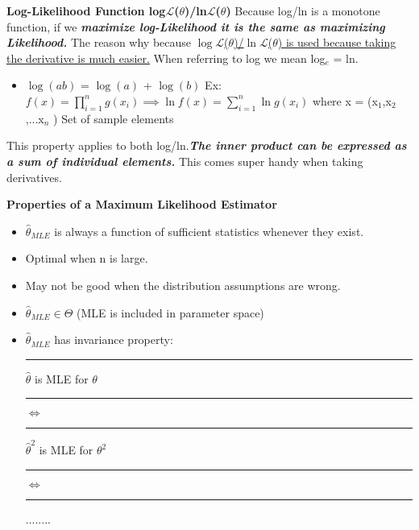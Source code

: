 \documentclass[]{article}
\begin{document}
\Large\textbf{Log-Likelihood Function log$\mathcal{L}$($\theta$)/ln$\mathcal{L}$($\theta$)}
\newline Because log/ln is a monotone function, if we \textbf{\textit{maximize log-Likelihood it is the same as maximizing Likelihood.} } The reason why  because \ul{$\log\mathcal{L}$($\theta$)/$\ln\mathcal{L}$($\theta$) is used because taking the derivative is much easier.} When referring to log we mean log$_e$ = ln.
\begin{itemize}
	\item $\log(ab)$ = $\log(a)$ + $\log(b)$
	\newline Ex: $f(x) = \displaystyle\prod_{i=1}^{n}g(x_i) \implies \ln{f(x)} =  \sum_{i=1}^{n} \ln g(x_i)$ 
	\newline where x = (x$_1$,x$_2$,...x$_n$ )  Set of sample elements
\end{itemize}
This property applies to both log/ln.\textbf{\textit{The inner product can be expressed as a sum of individual elements.}} This comes super handy when taking derivatives.

\newpage
\Large\textbf{Properties of a Maximum Likelihood Estimator}
\begin{itemize}
	\item $\hat\theta_{MLE}$ is always a function of sufficient statistics whenever they exist.
	\item Optimal when n is large.
	\item May not be good when the distribution assumptions are wrong.
	\item $\hat\theta_{MLE} \in \Theta$ (MLE is included in parameter space)
	\item $\hat\theta_{MLE}$ has invariance property:
	\newline\Large\rule{7cm}{0pt} $\hat\theta$ is MLE for $\theta$ 
	\newline\Large\rule{8cm}{0pt} $\iff$ 
	\newline\Large\rule{7cm}{0pt} $\hat\theta^2$ is MLE for $\theta^2$ 
	\newline\Large\rule{8cm}{0pt} $\iff$ 
	\newline\Large\rule{8cm}{0pt} ........
\end{itemize}


\newpage
\end{document}
